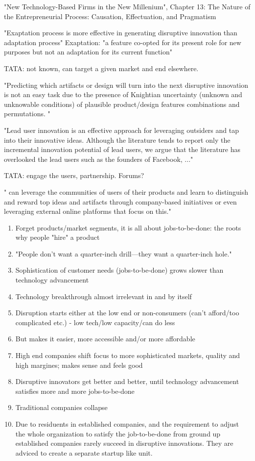 \documentclass[a4paper,10pt]{book}
\begin{document}
"New Technology-Based Firms in the New Millenium", Chapter 13:  The Nature of the Entrepreneurial Process: Causation, Effectuation, and Pragmatism



"Exaptation process is more effective in generating disruptive innovation than adaptation
process"  \cite{managingDisruptiveInnovation}
Exaptation: "a feature co-opted for its present role for new purposes but not an adaptation for its
current function"

TATA: not known, can target a given market and end elsewhere.

"Predicting which artifacts or design will turn into the next disruptive innovation is not an easy task
due to the presence of Knightian uncertainty (unknown and unknowable conditions) of plausible
product/design features combinations and permutations. "


"Lead user innovation is an effective approach for leveraging outsiders and tap into their innovative
ideas. Although the literature tends to report only the incremental innovation potential of lead users,
we argue that the literature has overlooked the lead users such as the founders of Facebook, ..."

TATA: engage the users, partnership. Forums?

" can leverage the communities of users of their products and learn to distinguish and
reward top ideas and artifacts through company-based initiatives or even leveraging external online
platforms that focus on this."




\begin{enumerate}
 \item Forget products/market segments, it is all about jobs-to-be-done: the roots why people "hire" a product
 \item "People don’t want a quarter-inch drill—they want a quarter-inch hole."
 \item Sophistication of customer needs (jobs-to-be-done) grows slower than technology advancement 
 \item Technology breakthrough almost irrelevant in and by itself
 \item Disruption starts either at the low end or non-consumers (can't afford/too complicated etc.) - low tech/low capacity/can do less
 \item But makes it easier, more accessible and/or more affordable
 \item High end companies shift focus to more sophisticated markets, quality and high margines; makes sense and feels good
 \item Disruptive innovators get better and better, until technology advancement satisfies more and more jobs-to-be-done
 \item Traditional companies collapse
 \item Due to residuents in established companies, and the requirement to adjust the whole organization to satisfy the job-to-be-done from ground up
  established companies rarely succeed in disruptive innovations. They are adviced to create a separate startup like unit.
\end{enumerate}
\end{document}
